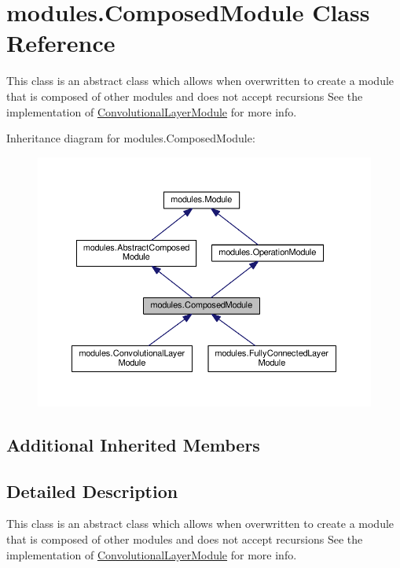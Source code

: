 \hypertarget{classmodules_1_1_composed_module}{}\section{modules.\+Composed\+Module Class Reference}
\label{classmodules_1_1_composed_module}


This class is an abstract class which allows when overwritten to create a module that is composed of other modules and does not accept recursions See the implementation of \hyperlink{classmodules_1_1_convolutional_layer_module}{Convolutional\+Layer\+Module} for more info.  




Inheritance diagram for modules.\+Composed\+Module\+:\nopagebreak
\begin{figure}[H]
\begin{center}
\leavevmode
\includegraphics[width=350pt]{classmodules_1_1_composed_module__inherit__graph}
\end{center}
\end{figure}
\subsection*{Additional Inherited Members}


\subsection{Detailed Description}
This class is an abstract class which allows when overwritten to create a module that is composed of other modules and does not accept recursions See the implementation of \hyperlink{classmodules_1_1_convolutional_layer_module}{Convolutional\+Layer\+Module} for more info. 

